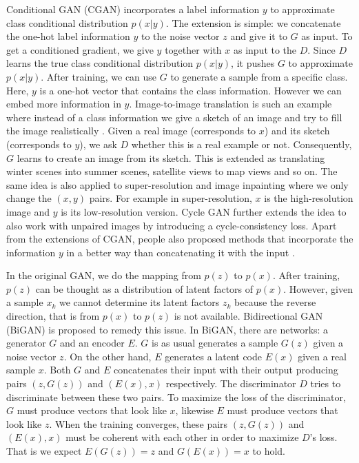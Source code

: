 \documentclass[a4paper,onesided,12pt]{report}
\begin{document}
Conditional GAN (CGAN) \cite{mirza2014conditional} incorporates a label information $y$ to approximate class conditional distribution $p(x|y)$. The extension is simple: we concatenate the one-hot label information $y$ to the noise vector $z$ and give it to $G$ as input. To get a conditioned gradient, we give $y$ together with $x$ as input to the $D$. Since $D$ learns the true class conditional distribution $p(x|y)$, it pushes $G$ to approximate $p(x|y)$. After training, we can use $G$ to generate a sample from a specific class. Here, $y$ is a one-hot vector that contains the class information. However we can embed more information in $y$. Image-to-image translation is such an example where instead of a class information we give a sketch of an image and try to fill the image realistically \cite{isola2017image}. Given a real image (corresponds to $x$) and its sketch (corresponds to $y$), we ask $D$ whether this is a real example or not. Consequently, $G$ learns to create an image from its sketch. This is extended as translating winter scenes into summer scenes, satellite views to map views and so on. The same idea is also applied to super-resolution \cite{ledig2017photo} and image inpainting \cite{yeh2017semantic} where we only change the $(x, y)$ pairs. For example in super-resolution, $x$ is the high-resolution image and $y$ is its low-resolution version. Cycle GAN \cite{zhu2017unpaired} further extends the idea to also work with unpaired images by introducing a cycle-consistency loss. Apart from the extensions of CGAN, people also proposed methods that incorporate the information $y$ in a better way than concatenating it with the input \cite{miyato2018cgans}.

In the original GAN, we do the mapping from $p(z)$ to $p(x)$.  After training, $p(z)$ can be thought as a distribution of latent factors of $p(x)$. However, given a sample $x_k$ we cannot determine its latent factors $z_k$ because the reverse direction, that is from $p(x)$ to $p(z)$ is not available. Bidirectional GAN (BiGAN) \cite{donahue2016adversarial,dumoulin2016adversarially} is proposed to remedy this issue. In BiGAN, there are networks: a generator $G$ and an encoder $E$. $G$ is as usual generates a sample $G(z)$ given a noise vector $z$. On the other hand, $E$ generates a latent code $E(x)$ given a real sample $x$. Both $G$ and $E$ concatenates their input with their output producing pairs $(z, G(z))$ and $(E(x), x)$ respectively. The discriminator $D$ tries to discriminate between these two pairs. To maximize the loss of the discriminator, $G$ must produce vectors that look like $x$, likewise $E$ must produce vectors that look like $z$. When the training converges, these pairs $(z, G(z))$ and $(E(x), x)$ must be coherent with each other in order to maximize $D$'s loss. That is we expect $E(G(z))=z$  and $G(E(x))=x$ to hold.
\end{document}
